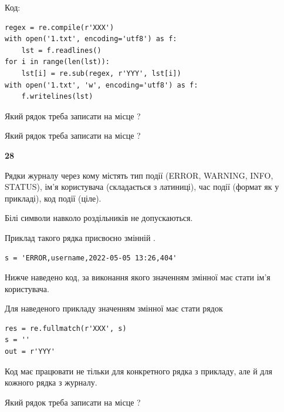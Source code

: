 Код:



\begin{verbatim}
regex = re.compile(r'XXX')
with open('1.txt', encoding='utf8') as f:
    lst = f.readlines()
for i in range(len(lst)):
    lst[i] = re.sub(regex, r'YYY', lst[i])
with open('1.txt', 'w', encoding='utf8') as f:
    f.writelines(lst)
\end{verbatim}







Який рядок треба записати на місце  ?\par
\vspace{5mm}


Який рядок треба записати на місце  ?\par


\newpage

{\begin {center}\textbf{ 28}\end {center}}\par
Рядки журналу через кому містять тип події (ERROR, WARNING, INFO, STATUS), ім'я користувача (складається з латиниці), час події (фор\-мат як у прикладі), код події (ціле).

Білі символи навколо роздільників не допускаються.

Приклад такого рядка присвоєно змінній .



\begin{verbatim}
s = 'ERROR,username,2022-05-05 13:26,404'
\end{verbatim}


Нижче наведено код, за виконання якого значенням змінної  має стати ім'я користувача.

Для наведеного прикладу значенням змінної  має стати рядок 



\begin{verbatim}
res = re.fullmatch(r'XXX', s)
s = ''
out = r'YYY'
\end{verbatim}


Код має працювати не тільки для конкретного рядка з прикладу, але й для кожного рядка з журналу.




Який рядок треба записати на місце  ?\par
\vspace{5mm}


